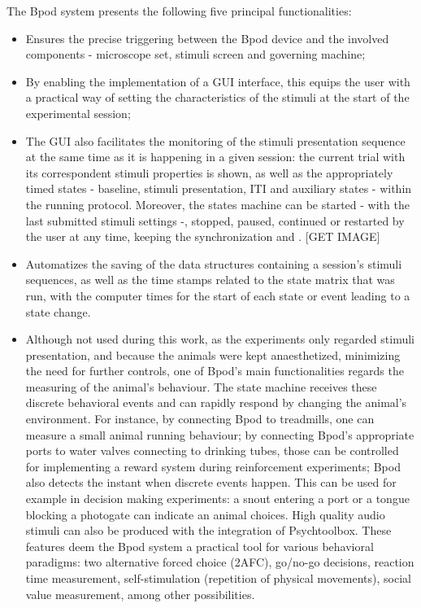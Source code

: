 The Bpod system presents the following five principal functionalities:

\begin{itemize}
\item Ensures the precise triggering between the Bpod device and the involved components - microscope set, stimuli screen and governing machine;
\item By enabling the implementation of a GUI interface, this equips the user with a practical way of setting the characteristics of the stimuli at the start of the experimental session;
\item The GUI also facilitates the monitoring of the stimuli presentation sequence at the same time as it is happening in a given session: the current trial with its correspondent stimuli properties is shown, as well as the appropriately timed states - baseline, stimuli presentation, ITI and auxiliary states - within the running protocol. Moreover, the states machine can be started - with the last submitted stimuli settings -, stopped, paused, continued or restarted by the user at any time, keeping the synchronization and . [GET IMAGE] 
\item Automatizes the saving of the data structures containing a session's stimuli sequences, as well as the time stamps related to the state matrix that was run, with the computer times for the start of each state or event leading to a state change.
\item Although not used during this work, as the experiments only regarded stimuli presentation, and because the animals were kept anaesthetized, minimizing the need for further controls, one of Bpod's main functionalities regards the measuring of the animal's behaviour. The state machine receives these discrete behavioral events and can rapidly respond by changing the animal's environment. For instance, by connecting Bpod to treadmills, one can measure a small animal running behaviour;  by connecting Bpod's appropriate ports to water valves connecting to drinking tubes, those can be controlled for implementing a reward system during reinforcement experiments; Bpod also detects the instant when discrete events happen. This can be used for example in decision making experiments: a snout entering a port or a tongue blocking a photogate can indicate an animal choices. High quality audio stimuli can also be produced with the integration of Psychtoolbox. These features deem the Bpod system a practical tool for various behavioral paradigms: two alternative forced choice (2AFC), go/no-go decisions, reaction time measurement, self-stimulation (repetition of physical movements), social value measurement, among other possibilities. 
\end{itemize}

